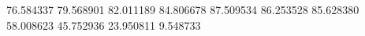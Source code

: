 76.584337
79.568901
82.011189
84.806678
87.509534
86.253528
85.628380
58.008623
45.752936
23.950811
9.548733
